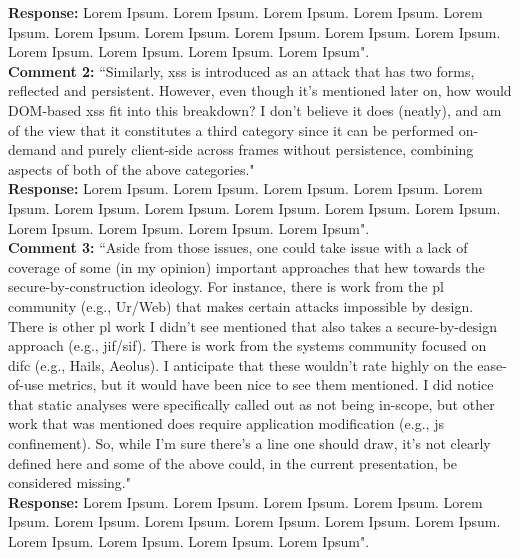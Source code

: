 \documentclass[10pt,journal,compsoc]{IEEEtran}
\begin{document}
\noindent
{\bf Response:}
Lorem Ipsum. Lorem Ipsum. Lorem Ipsum. Lorem Ipsum. Lorem Ipsum. Lorem Ipsum. Lorem Ipsum. Lorem Ipsum. Lorem Ipsum. Lorem Ipsum. Lorem Ipsum. Lorem Ipsum. Lorem Ipsum. Lorem Ipsum".\\

\noindent
{\bf Comment 2:} ``Similarly, {\sc xss} is introduced as an attack that has two forms, reflected and
persistent.  However, even though it's mentioned later on, how would DOM-based
{\sc xss} fit into this breakdown?  I don't believe it does (neatly), and am of the
view that it constitutes a third category since it can be performed on-demand
and purely client-side across frames without persistence, combining aspects of
both of the above categories."\\

\noindent
{\bf Response:}
Lorem Ipsum. Lorem Ipsum. Lorem Ipsum. Lorem Ipsum. Lorem Ipsum. Lorem Ipsum. Lorem Ipsum. Lorem Ipsum. Lorem Ipsum. Lorem Ipsum. Lorem Ipsum. Lorem Ipsum. Lorem Ipsum. Lorem Ipsum".\\

\noindent
{\bf Comment 3:} ``Aside from those issues, one could take issue with a lack of coverage of some
(in my opinion) important approaches that hew towards the
secure-by-construction ideology. For instance, there is work from the {\sc pl}
community (e.g., Ur/Web) that makes certain attacks impossible by design.
There is other {\sc pl} work I didn't see mentioned that also takes a
secure-by-design approach (e.g., {\sc jif}/{\sc sif}). There is work from the systems
community focused on {\sc difc} (e.g., Hails, Aeolus).  I anticipate that these
wouldn't rate highly on the ease-of-use metrics, but it would have been nice
to see them mentioned.  I did notice that static analyses were specifically
called out as not being in-scope, but other work that was mentioned does
require application modification (e.g., {\sc js} confinement).  So, while I'm sure
there's a line one should draw, it's not clearly defined here and some of the
above could, in the current presentation, be considered missing."\\

\noindent
{\bf Response:}
Lorem Ipsum. Lorem Ipsum. Lorem Ipsum. Lorem Ipsum. Lorem Ipsum. Lorem Ipsum. Lorem Ipsum. Lorem Ipsum. Lorem Ipsum. Lorem Ipsum. Lorem Ipsum. Lorem Ipsum. Lorem Ipsum. Lorem Ipsum".\\



\end{document}

